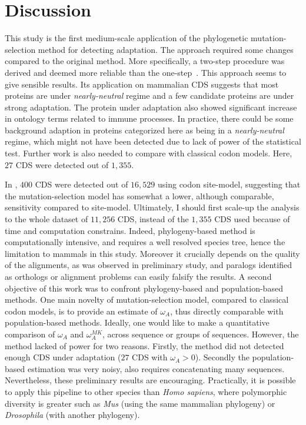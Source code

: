 \documentclass{article}
\begin{document}
\section*{Discussion}

This study is the first medium-scale application of the phylogenetic mutation-selection method for detecting adaptation.
The approach required some changes compared to the original method.
More specifically, a two-step procedure was derived and deemed more reliable than the one-step~\citep{Lartillot2013}.
This approach seems to give sensible results.
Its application on mammalian CDS suggests that most proteins are under \textit{nearly-neutral} regime and a few candidate proteins are under strong adaptation.
The protein under adaptation also showed significant increase in ontology terms related to immune processes.
In practice, there could be some background adaption in proteins categorized here as being in a \textit{nearly-neutral} regime, which might not have been detected due to lack of power of the statistical test.
Further work is also needed to compare with classical codon models.
Here, $27$ CDS were detected out of $1,355$.

In \citet{Kosiol2008}, $400$ CDS were detected out of $16,529$ using codon site-model, suggesting that the mutation-selection model has somewhat a lower, although comparable, sensitivity compared to site-model.
Ultimately, I should first scale-up the analysis to the whole dataset of $11,256$ CDS, instead of the $1,355$ CDS used because of time and computation constrains.
Indeed, phylogeny-based method is computationally intensive, and requires a well resolved species tree, hence the limitation to mammals in this study.
Moreover it crucially depends on the quality of the alignments, as was observed in preliminary study, and paralogs identified as orthologs or alignment problems can easily falsify the results.
A second objective of this work was to confront phylogeny-based and population-based methods.
One main novelty of mutation-selection model, compared to classical codon models, is to provide an estimate of $\omega_A$, thus directly comparable with population-based methods.
Ideally, one would like to make a quantitative comparison of $\omega_A$ and $\omega_A^{MK}$, across sequence or groups of sequences.
However, the method lacked of power for two reasons.
Firstly, the method did not detected enough CDS under adaptation ($27$ CDS with $\omega_A > 0$).
Secondly the population-based estimation was very noisy, also requires concatenating many sequences.
Nevertheless, these preliminary results are encouraging.
Practically, it is possible to apply this pipeline to other species than \textit{Homo sapiens}, where polymorphic diversity is greater such as \textit{Mus} (using the same mammalian phylogeny) or \textit{Drosophila} (with another phylogeny).
\end{document}
